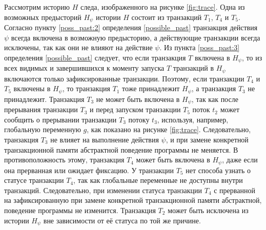 Рассмотрим историю $H$ следа, изображенного на рисунке \ref{fig:trace}. Одна из возможных предысторий $H_{\psi}$ истории $H$ состоит из транзакций $T_1$, $T_4$ и $T_5$. Согласно пункту \ref{poss_past:2} определения \ref{possible_past} транзакция действия $\psi$ всегда включена в возможную предысторию, а действующие транзакции всегда исключены, так как они не влияют на действие $\psi$. Из пункта \ref{poss_past:3} определения \ref{possible_past} следует, что если транзакция $T$ включена в $H_{\psi}$, то из всех видимых и завершившихся к моменту запуска $T$ транзакций в $H_{\psi}$ включаются только зафиксированные транзакции. Поэтому, если транзакции $T_4$ и $T_5$ включены в $H_{\psi}$, то транзакция $T_1$ тоже принадлежит $H_{\psi}$, а транзакция $T_3$ не принадлежит. Транзакция $T_3$ не может быть включена в $H_{\psi}$, так как после прерывания транзакции $T_3$ и перед запуском транзакции $T_5$ поток $t_2$ может сообщить о прерывании транзакции $T_3$ потоку $t_3$, используя, например, глобальную переменную $g$, как показано на рисунке \ref{fig:trace}. Следовательно, транзакция $T_3$ не влияет на выполнение действия $\psi$, и при замене конкретной транзакционной памяти абстрактной поведение программы не меняется. В противоположность этому, транзакция $T_4$ может быть включена в $H_{\psi}$, даже если она прерванная или ожидает фиксацию. У транзакции $T_5$ нет способа узнать о статусе транзакции $T_4$, так как глобальные переменные не доступны внутри транзакций. Следовательно, при изменении статуса транзакции $T_4$ с прерванной на зафиксированную при замене конкретной транзакционной памяти абстрактной, поведение программы не изменится. Транзакция $T_2$ может быть исключена из истории $H_{\psi}$ вне зависимости от её статуса по той же причине. 

